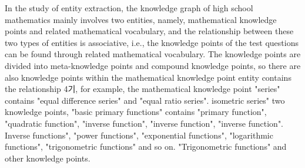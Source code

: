 \documentclass[11pt,en]{elegantpaper}
\begin{document}
In the study of entity extraction, the knowledge graph of high school mathematics mainly involves two entities, namely, mathematical knowledge points and related mathematical vocabulary, and the relationship between these two types of entities is associative, i.e., the knowledge points of the test questions can be found through related mathematical vocabulary. The knowledge points are divided into meta-knowledge points and compound knowledge points, so there are also knowledge points within the mathematical knowledge point entity contains the relationship 4기, for example, the mathematical knowledge point "series" contains "equal difference series" and "equal ratio series". isometric series" two knowledge points, "basic primary functions" contains "primary function", "quadratic function", "inverse function", "inverse function", "inverse function". Inverse functions", "power functions", "exponential functions", "logarithmic functions", "trigonometric functions" and so on. "Trigonometric functions" and other knowledge points.
\end{document}
